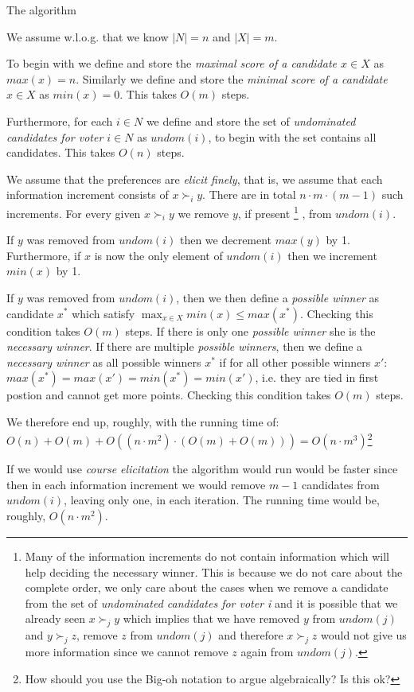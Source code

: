 \documentclass[12pt]{article}
\newenvironment{answer}[2][Answer]{\begin{trivlist}
\item[\hskip \labelsep {\bfseries #1}\hskip \labelsep {\bfseries #2:}]}{\end{trivlist}}
\begin{document}
\begin{answer}{a)}{The algorithm}

We assume w.l.o.g. that we know $|N|=n$ and $|X|=m$.

To begin with we define and store the \textit{maximal score of a candidate $x \in X$} as $max(x)=n$. Similarly we define and store the \textit{minimal score of a candidate $x \in X$} as $min(x)=0$. This takes $O(m)$ steps.

Furthermore, for each $i \in N$ we define and store the set of \textit{undominated candidates for voter $i \in N$} as $undom(i)$, to begin with the set contains all candidates. This takes $O(n)$ steps.

We assume that the preferences are \textit{elicit finely}, that is, we assume that each information increment consists of $x \succ_i y$. There are in total $n \cdot m \cdot (m-1)$ such increments. For every given $x \succ_i y$ we remove $y$, if present
\footnote{Many of the information increments do not contain information which will help deciding the necessary winner. This is because we do not care about the complete order, we only care about the cases when we remove a candidate from the set of \textit{undominated candidates for voter i} and it is possible that we already seen $x \succ_j y$ which implies that we have removed $y$ from $undom(j)$ and $y \succ_j z$, remove $z$ from $undom(j)$ and therefore $x \succ_j z$ would not give us more information since we cannot remove $z$ again from $undom(j)$.}
, from $undom(i)$.

If $y$ was removed from $undom(i)$ then we decrement $max(y)$ by 1. Furthermore, if $x$ is now the only element of $undom(i)$ then we increment $min(x)$ by 1.

If $y$ was removed from $undom(i)$, then we then define a \textit{possible winner} as candidate $x^*$ which satisfy $\max_{x \in X} min(x) \leq max(x^*)$. Checking this condition takes $O(m)$ steps. If there is only one \textit{possible winner} she is the \textit{necessary winner}. If there are multiple \textit{possible winners}, then we define a \textit{necessary winner} as all possible winners $x^*$ if for all other possible winners $x'$: $max(x^*) = max(x') =min(x^*) = min(x')$, i.e. they are tied in first postion and cannot get more points. Checking this condition takes $O(m)$ steps.

We therefore end up, roughly, with the running time of: $O(n) + O(m) + O((n \cdot m^2) \cdot (O(m) + O(m)))=O(n \cdot m^3)$\footnote{How should you use the Big-oh notation to argue algebraically? Is this ok?}

If we would use \textit{course elicitation} the algorithm would run would be faster since then in each information increment we would remove $m-1$ candidates from $undom(i)$, leaving only one, in each iteration. The running time would be, roughly, $O(n \cdot m^2)$.
\end{answer}
\end{document}
